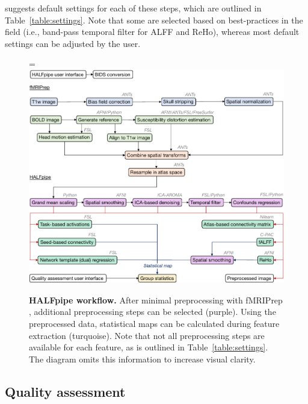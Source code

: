  suggests default settings for each of these steps, which
are outlined in Table~\ref{table:settings}. Note that some are selected based on
best-practices in the field (i.e., band-pass temporal filter for ALFF and
ReHo), whereas most default settings can be adjusted by the user.

\begin{figure}[!tb]
\begin{adjustwidth}{-2.4cm}{}
\hsize=\linewidth%
\includegraphics[width=\linewidth]{fig/workflow-crop}
\caption{\textbf{HALFpipe workflow.} After minimal preprocessing with
fMRIPrep \parencite{10.1038/s41592-018-0235-4}, additional preprocessing
steps can be selected (purple). Using the preprocessed data, statistical
maps can be calculated during feature extraction (turquoise). Note that
not all preprocessing steps are available for each feature, as is outlined
in Table~\ref{table:settings}. The diagram omits this information to 
increase visual clarity.}\label{fig:workflow}
\end{adjustwidth}
\end{figure}

\subsection{Quality assessment}\label{sec:qamethods}

